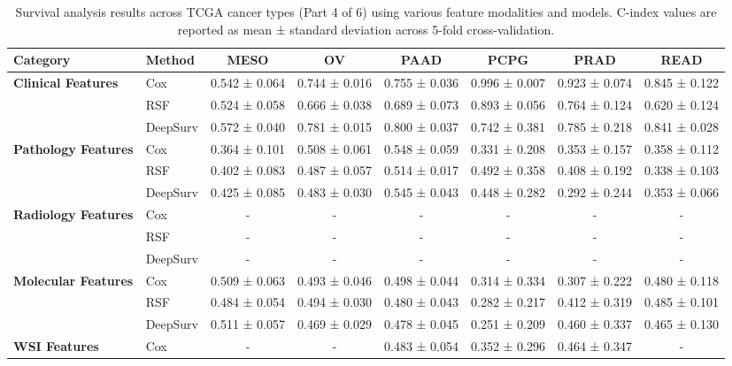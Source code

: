 \begin{sidewaystable}[htbp]
    \centering
    \caption{Survival analysis results across TCGA cancer types (Part 4 of 6) using various feature modalities and models. C-index values are reported as mean ± standard deviation across 5-fold cross-validation.}
    \label{tab:survival_results_4}
    \begin{tabular}{@{}llcccccc@{}}
        \toprule
        \textbf{Category} & \textbf{Method} & \textbf{MESO} & \textbf{OV} & \textbf{PAAD} & \textbf{PCPG} & \textbf{PRAD} & \textbf{READ} \\
        \midrule
        \multirow{3}{*}{\textbf{Clinical Features}} & Cox & 0.542 ± 0.064 & 0.744 ± 0.016 & 0.755 ± 0.036 & 0.996 ± 0.007 & 0.923 ± 0.074 & 0.845 ± 0.122 \\
        & RSF & 0.524 ± 0.058 & 0.666 ± 0.038 & 0.689 ± 0.073 & 0.893 ± 0.056 & 0.764 ± 0.124 & 0.620 ± 0.124 \\
        & DeepSurv & 0.572 ± 0.040 & 0.781 ± 0.015 & 0.800 ± 0.037 & 0.742 ± 0.381 & 0.785 ± 0.218 & 0.841 ± 0.028 \\
        \midrule
        \multirow{3}{*}{\textbf{Pathology Features}} & Cox & 0.364 ± 0.101 & 0.508 ± 0.061 & 0.548 ± 0.059 & 0.331 ± 0.208 & 0.353 ± 0.157 & 0.358 ± 0.112 \\
        & RSF & 0.402 ± 0.083 & 0.487 ± 0.057 & 0.514 ± 0.017 & 0.492 ± 0.358 & 0.408 ± 0.192 & 0.338 ± 0.103 \\
        & DeepSurv & 0.425 ± 0.085 & 0.483 ± 0.030 & 0.545 ± 0.043 & 0.448 ± 0.282 & 0.292 ± 0.244 & 0.353 ± 0.066 \\
        \midrule
        \multirow{3}{*}{\textbf{Radiology Features}} & Cox & - & - & - & - & - & - \\
        & RSF & - & - & - & - & - & - \\
        & DeepSurv & - & - & - & - & - & - \\
        \midrule
        \multirow{3}{*}{\textbf{Molecular Features}} & Cox & 0.509 ± 0.063 & 0.493 ± 0.046 & 0.498 ± 0.044 & 0.314 ± 0.334 & 0.307 ± 0.222 & 0.480 ± 0.118 \\
        & RSF & 0.484 ± 0.054 & 0.494 ± 0.030 & 0.480 ± 0.043 & 0.282 ± 0.217 & 0.412 ± 0.319 & 0.485 ± 0.101 \\
        & DeepSurv & 0.511 ± 0.057 & 0.469 ± 0.029 & 0.478 ± 0.045 & 0.251 ± 0.209 & 0.460 ± 0.337 & 0.465 ± 0.130 \\
        \midrule
        \multirow{3}{*}{\textbf{WSI Features}} & Cox & - & - & 0.483 ± 0.054 & 0.352 ± 0.296 & 0.464 ± 0.347 & - \\

\end{tabular}
\end{sidewaystable}
